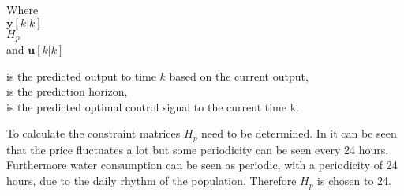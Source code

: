  \begin{minipage}[t]{0.20\textwidth}
 Where\\
 \hspace*{8mm} $\bm{y}[k|k]$ \\
 \hspace*{8mm} $H_p$ \\
 and \hspace*{0.7mm} $\bm{u}[k|k]$	
 \end{minipage}
 \begin{minipage}[t]{0.68\textwidth}
 \vspace*{2mm}
 is the predicted output to time $k$ based on the current output, \\
 is the prediction horizon,\\
 is the predicted optimal control signal to the current time k.
 \end{minipage}

To calculate the constraint matrices $H_p$ need to be determined. In  it can be seen that the price fluctuates a lot but some periodicity can be seen every 24 hours. Furthermore water consumption can be seen as periodic, with a periodicity of 24 hours, due to the daily rhythm of the population. Therefore $H_p$ is chosen to 24. 





